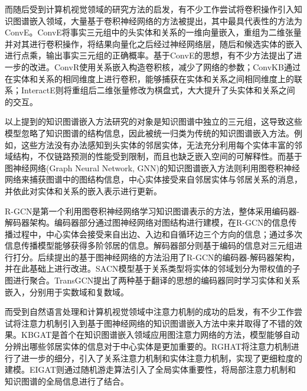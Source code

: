 而随后受到计算机视觉领域的研究方法的启发，有不少工作尝试将卷积操作引入知识图谱嵌入领域，大量基于卷积神经网络的方法被提出，其中最具代表性的方法为ConvE。ConvE将事实三元组中的头实体和关系的一维向量嵌入，重组为二维张量并对其进行卷积操作，将结果向量化之后经过神经网络层，随后和候选实体的嵌入进行点乘，输出事实三元组的正确概率。基于ConvE的思想，有不少方法提出了进一步的改进。ConvR使用关系嵌入构造卷积核，减少了网络的参数；ConvKB通过在实体和关系的相同维度上进行卷积，能够捕获在实体和关系之间相同维度上的联系；InteractE则将重组后二维张量修改为棋盘式，大大提升了头实体和关系之间的交互。

以上提到的知识图谱嵌入方法研究的对象是知识图谱中独立的三元组，这导致这些模型忽略了知识图谱的结构信息，因此被统一归类为传统的知识图谱嵌入方法。例如，这些方法没有办法感知到头实体的邻居实体，无法充分利用每个实体丰富的邻域结构，不仅链路预测的性能受到限制，而且也缺乏嵌入空间的可解释性。而基于图神经网络(Graph Neural Network, GNN)的知识图谱嵌入方法则利用图卷积神经网络来捕获图谱中的图结构信息，中心实体接受来自邻居实体与邻居关系的消息，并依此对实体和关系的嵌入表示进行更新。

R-GCN是第一个利用图卷积神经网络学习知识图谱表示的方法，整体采用编码器-解码器架构。编码器部分通过图神经网络对图结构进行建模，在R-GCN的信息传播过程中，中心实体会接受来自出边、入边和自循环边三个方向的信息；通过多次信息传播模型能够获得多阶邻居的信息。解码器部分则基于编码的信息对三元组进行打分。后续提出的基于图神经网络的方法沿用了R-GCN的编码器-解码器架构，并在此基础上进行改进。SACN模型基于关系类型将实体的邻域划分为带权值的子图进行聚合。TransGCN提出了两种基于翻译的思想的编码器同时学习实体和关系嵌入，分别用于实数域和复数域。

而受到自然语言处理和计算机视觉领域中注意力机制的成功的启发，有不少工作尝试将注意力机制引入到基于图神经网络的知识图谱嵌入方法中来并取得了不错的效果。KBGAT是首个在知识图谱嵌入领域应用图注意力网络的方法，模型能够自动分辨出哪些邻居实体的信息对于中心实体是更加重要的。RGHAT将注意力机制进行了进一步的细分，引入了关系注意力机制和实体注意力机制，实现了更细粒度的建模。EIGAT则通过随机游走算法引入了全局实体重要性，将局部注意力机制和知识图谱的全局信息进行了结合。

